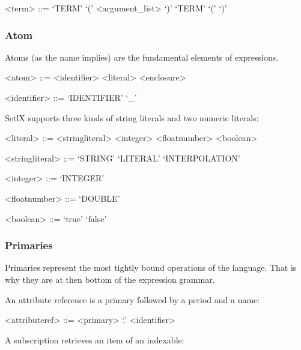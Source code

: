 %

\begin{grammar}
<term> ::= `TERM' `(' <argument_list> `)'
\alt `TERM' `(' `)'
\end{grammar}

%
\subsubsection{Atom}

Atoms (as the name implies) are the fundamental elements of expressions.

\begin{grammar}
<atom> ::= <identifier>
\alt <literal>
\alt <enclosure>

<identifier> ::= `IDENTIFIER'
\alt `_'
\end{grammar}

%

SetlX supports three kinds of string literals and two numeric literals:

\begin{grammar}
<literal> ::= <stringliteral>
\alt <integer>
\alt <floatnumber>
\alt <boolean>

<stringliteral> ::= `STRING'
\alt `LITERAL'
\alt `INTERPOLATION'

<integer> ::= `INTEGER'

<floatnumber> ::= `DOUBLE'

<boolean> ::= `true'
\alt `false'
\end{grammar}

%
\subsubsection{Primaries}

Primaries represent the most tightly bound operations of the language. That is why they are at then bottom of the expression grammar.

%

An attribute reference is a primary followed by a period and a name:

\begin{grammar}
<attributeref> ::= <primary> `.' <identifier>
\end{grammar}

%

A subscription retrieves an item of an indexable:

